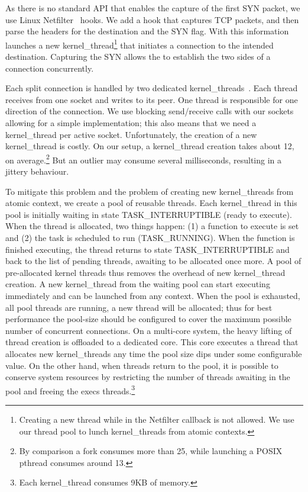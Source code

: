 As there is no standard API that enables the capture of the first SYN packet, we use Linux Netfilter~\cite{netfilter} hooks. We add a hook that captures TCP packets, and then parse the headers for the destination and the SYN flag. With this information \oursys launches a new kernel\_thread\footnote{Creating a new thread while in the Netfilter callback is not allowed. We use our thread pool to lunch kernel\_threads from atomic contexts.} that initiates a connection to the intended destination. Capturing the SYN allows the \proxies to establish the two sides of a connection concurrently.

Each split connection is handled by two dedicated kernel\_threads~\cite{kthread}. Each thread receives from one socket and writes to its peer. One thread is responsible for one direction of the connection. We use blocking send/receive calls with our sockets allowing for a simple implementation; this also means that we need a kernel\_thread per active socket. Unfortunately, the creation of a new kernel\_thread is costly. On our setup, a kernel\_thread creation takes about 12\usec, on average.\footnote{By comparison a fork consumes more than 25\usec , while launching a POSIX pthread consumes around 13\usec.} But an outlier may consume several milliseconds, resulting in a jittery behaviour.

To mitigate this problem and the problem of creating new kernel\_threads from atomic context, we create a pool of reusable threads. Each kernel\_thread in this pool is initially waiting in state TASK\_INTERRUPTIBLE (ready to execute). When the thread is allocated, two things happen: (1) a function to execute is set and (2)  the task is scheduled to run (TASK\_RUNNING). When the function is finished executing, the thread returns to state TASK\_INTERRUPTIBLE and back to the list of pending threads, awaiting to be allocated once more. A pool of pre-allocated kernel threads thus removes the overhead of new kernel\_thread creation. A new kernel\_thread from the waiting pool can start executing immediately and can be launched from any context. When the pool is exhausted, \ie all pool threads are running, a new thread will be allocated; thus for best performance the pool-size should be configured to cover the maximum possible number of concurrent connections. On a multi-core system, the heavy lifting of thread creation is offloaded to a dedicated core. This core executes a thread that allocates new kernel\_threads any time the pool size dips under some configurable value. On the other hand, when threads return to the pool, it is possible to conserve system resources by restricting the number of threads awaiting in the pool and freeing the execs threads.\footnote{Each kernel\_thread consumes 9KB of memory.}

